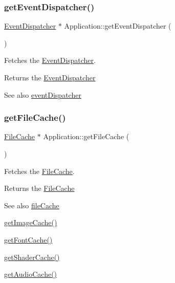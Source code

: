 \subsubsection{\texorpdfstring{getEventDispatcher()}{getEventDispatcher()}}
{\footnotesize\ttfamily \mbox{\hyperlink{classsage_1_1EventDispatcher}{Event\+Dispatcher}} $\ast$ Application\+::get\+Event\+Dispatcher (\begin{DoxyParamCaption}{ }\end{DoxyParamCaption})}



Fetches the \mbox{\hyperlink{classsage_1_1EventDispatcher}{Event\+Dispatcher}}. 

\begin{DoxyReturn}{Returns}
the \mbox{\hyperlink{classsage_1_1EventDispatcher}{Event\+Dispatcher}} 
\end{DoxyReturn}
\begin{DoxySeeAlso}{See also}
\mbox{\hyperlink{classsage_1_1Application_af44decd857e2843750a781ec141163f0}{event\+Dispatcher}} 
\end{DoxySeeAlso}
\mbox{\label{classsage_1_1Application_a782edaec320c507870814d8576f84fba}} 
\subsubsection{\texorpdfstring{getFileCache()}{getFileCache()}}
{\footnotesize\ttfamily \mbox{\hyperlink{classsage_1_1FileCache}{File\+Cache}} $\ast$ Application\+::get\+File\+Cache (\begin{DoxyParamCaption}{ }\end{DoxyParamCaption})}



Fetches the \mbox{\hyperlink{classsage_1_1FileCache}{File\+Cache}}. 

\begin{DoxyReturn}{Returns}
the \mbox{\hyperlink{classsage_1_1FileCache}{File\+Cache}} 
\end{DoxyReturn}
\begin{DoxySeeAlso}{See also}
\mbox{\hyperlink{classsage_1_1Application_ab576f71a5b927d4b7f7790ae0b15c213}{file\+Cache}} 

\mbox{\hyperlink{classsage_1_1Application_a3c8156460d822447b22835bc4879c1a1}{get\+Image\+Cache()}} 

\mbox{\hyperlink{classsage_1_1Application_a4cd47a4230ba22582b6172ce430feb1d}{get\+Font\+Cache()}} 

\mbox{\hyperlink{classsage_1_1Application_aa9260bf22da6d4fc5451c789c17ad7a5}{get\+Shader\+Cache()}} 

\mbox{\hyperlink{classsage_1_1Application_aaed4c540666d784b83d5506e51fb5eaa}{get\+Audio\+Cache()}} 
\end{DoxySeeAlso}
\mbox{\label{classsage_1_1Application_a4cd47a4230ba22582b6172ce430feb1d}} 
